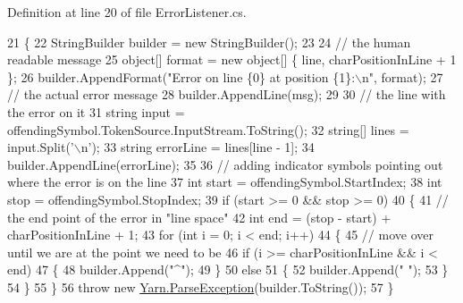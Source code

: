 Definition at line 20 of file Error\-Listener.\-cs.


\begin{DoxyCode}
21         \{
22             StringBuilder builder = \textcolor{keyword}{new} StringBuilder();
23 
24             \textcolor{comment}{// the human readable message}
25             \textcolor{keywordtype}{object}[] format = \textcolor{keyword}{new} \textcolor{keywordtype}{object}[] \{ line, charPositionInLine + 1 \};
26             builder.AppendFormat(\textcolor{stringliteral}{"Error on line \{0\} at position \{1\}:\(\backslash\)n"}, format);
27             \textcolor{comment}{// the actual error message}
28             builder.AppendLine(msg);
29 
30             \textcolor{comment}{// the line with the error on it}
31             \textcolor{keywordtype}{string} input = offendingSymbol.TokenSource.InputStream.ToString();
32             \textcolor{keywordtype}{string}[] lines = input.Split(\textcolor{charliteral}{'\(\backslash\)n'});
33             \textcolor{keywordtype}{string} errorLine = lines[line - 1];
34             builder.AppendLine(errorLine);
35 
36             \textcolor{comment}{// adding indicator symbols pointing out where the error is on the line}
37             \textcolor{keywordtype}{int} start = offendingSymbol.StartIndex;
38             \textcolor{keywordtype}{int} stop = offendingSymbol.StopIndex;
39             \textcolor{keywordflow}{if} (start >= 0 && stop >= 0)
40             \{
41                 \textcolor{comment}{// the end point of the error in "line space"}
42                 \textcolor{keywordtype}{int} end = (stop - start) + charPositionInLine + 1;
43                 \textcolor{keywordflow}{for} (\textcolor{keywordtype}{int} i = 0; i < end; i++)
44                 \{
45                     \textcolor{comment}{// move over until we are at the point we need to be}
46                     \textcolor{keywordflow}{if} (i >= charPositionInLine && i < end)
47                     \{
48                         builder.Append(\textcolor{stringliteral}{"^"});
49                     \}
50                     \textcolor{keywordflow}{else}
51                     \{
52                         builder.Append(\textcolor{stringliteral}{" "});
53                     \}
54                 \}
55             \}
56             \textcolor{keywordflow}{throw} \textcolor{keyword}{new} \hyperlink{a00141}{Yarn.ParseException}(builder.ToString());
57         \}
\end{DoxyCode}


